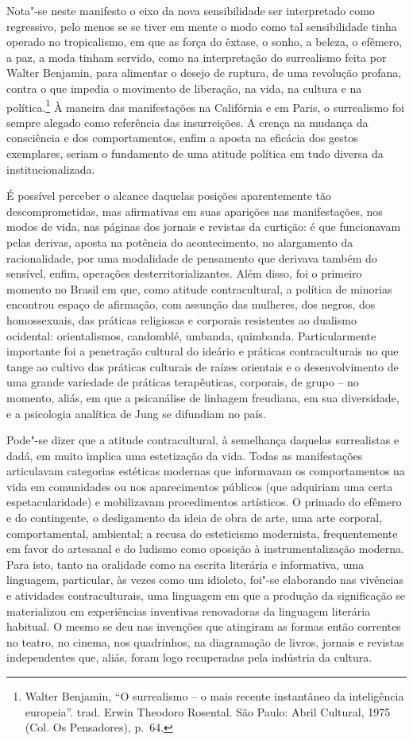 Nota"-se neste manifesto o eixo da nova sensibilidade ser interpretado
como regressivo, pelo menos se se tiver em mente o modo como tal
sensibilidade tinha operado no tropicalismo, em que as força do êxtase,
o sonho, a beleza, o efêmero, a paz, a moda tinham servido, como na
interpretação do surrealismo feita por Walter Benjamin, para alimentar o
desejo de ruptura, de uma revolução profana, contra o que impedia o
movimento de liberação, na vida, na cultura e na política.\footnote{Walter
  Benjamin, ``O surrealismo -- o mais recente instantâneo da
  inteligência europeia''. trad. Erwin Theodoro Rosental. São Paulo:
  Abril Cultural, 1975 (Col. Os Pensadores), p.~64.} À maneira das
manifestações na Califórnia e em Paris, o surrealismo foi sempre alegado
como referência das insurreições. A crença na mudança da consciência e
dos comportamentos, enfim a aposta na eficácia dos gestos exemplares,
seriam o fundamento de uma atitude política em tudo diversa da
institucionalizada.

É possível perceber o alcance daquelas posições aparentemente tão
descomprometidas, mas afirmativas em suas aparições nas manifestações,
nos modos de vida, nas páginas dos jornais e revistas da curtição: é que
funcionavam pelas derivas, aposta na potência do acontecimento, no
alargamento da racionalidade, por uma modalidade de pensamento que
derivava também do sensível, enfim, operações desterritorializantes.
Além disso, foi o primeiro momento no Brasil em que, como atitude
contracultural, a política de minorias encontrou espaço de afirmação,
com assunção das mulheres, dos negros, dos homossexuais, das práticas
religiosas e corporais resistentes ao dualismo ocidental: orientalismos,
candomblé, umbanda, quimbanda. Particularmente importante foi a
penetração cultural do ideário e práticas contraculturais no que tange
ao cultivo das práticas culturais de raízes orientais e o
desenvolvimento de uma grande variedade de práticas terapêuticas,
corporais, de grupo -- no momento, aliás, em que a psicanálise de
linhagem freudiana, em sua diversidade, e a psicologia analítica de Jung
se difundiam no país.

Pode"-se dizer que a atitude contracultural, à semelhança daquelas
surrealistas e dadá, em muito implica uma estetização da vida. Todas as
manifestações articulavam categorias estéticas modernas que informavam
os comportamentos na vida em comunidades ou nos aparecimentos públicos
(que adquiriam uma certa espetacularidade) e mobilizavam procedimentos
artísticos. O primado do efêmero e do contingente, o desligamento da
ideia de obra de arte, uma arte corporal, comportamental, ambiental; a
recusa do esteticismo modernista, frequentemente em favor do artesanal e
do ludismo como oposição à instrumentalização moderna. Para isto, tanto
na oralidade como na escrita literária e informativa, uma linguagem,
particular, às vezes como um idioleto, foi"-se elaborando nas vivências e
atividades contraculturais, uma linguagem em que a produção da
significação se materializou em experiências inventivas renovadoras da
linguagem literária habitual. O mesmo se deu nas invenções que atingiram
as formas então correntes no teatro, no cinema, nos quadrinhos, na
diagramação de livros, jornais e revistas independentes que, aliás,
foram logo recuperadas pela indústria da cultura.

